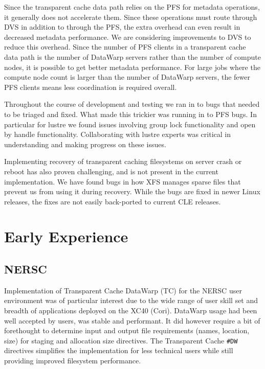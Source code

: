 \documentclass[10pt, conference, compsocconf]{IEEEtran}
\begin{document}
Since the transparent cache data path relies on the PFS for metadata operations, it generally does not accelerate them.  Since these operations must route through DVS in addition to through the PFS, the extra overhead can even result in decreased metadata performance.  We are considering improvements to DVS to reduce this overhead.  Since the number of PFS clients in a transparent cache data path is the number of DataWarp servers rather than the number of compute nodes, it is possible to get better metadata performance.  For large jobs where the compute node count is larger than the number of DataWarp servers, the fewer PFS clients means less coordination is required overall.

Throughout the course of development and testing we ran in to bugs that needed to be triaged and fixed.  What made this trickier was running in to PFS bugs.  In particular for lustre we found issues involving group lock functionality and open by handle functionality.  Collaborating with lustre experts was critical in understanding and making progress on these issues.

Implementing recovery of transparent caching filesystems on server crash or reboot has also proven challenging, and is not present in the current implementation.  We have found bugs in how XFS manages sparse files that prevent us from using it during recovery.  While the bugs are fixed in newer Linux releases, the fixes are not easily back-ported to current CLE releases.

\section{Early Experience\label{sec_ee}}

\subsection{NERSC}
Implementation of Transparent Cache DataWarp (TC) for the NERSC user environment was of particular interest due to the wide range of user skill set and breadth of applications deployed on the XC40 (Cori).  DataWarp usage had been well accepted by users, was stable and performant.  It did however require a bit of forethought to determine input and output file requirements (names, location, size) for staging and allocation size directives.  The Transparent Cache \texttt{\#DW} directives simplifies the implementation for less technical users while still providing improved filesystem performance.
\end{document}
